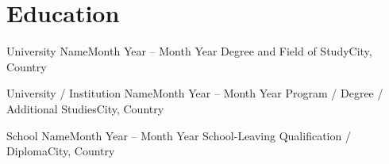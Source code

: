 \section{Education}

\resumeSubHeadingListStart

    \resumeSubheading
        {University Name}{Month Year -- Month Year}
        {Degree and Field of Study}{City, Country}

    \resumeItemListStart
    \resumeItemListEnd

    \resumeSubheading
        {University / Institution Name}{Month Year -- Month Year}
        {Program / Degree / Additional Studies}{City, Country}

    \resumeSubheading
        {School Name}{Month Year -- Month Year}
        {School-Leaving Qualification / Diploma}{City, Country}

    \resumeItemListStart
    \resumeItemListEnd

\resumeSubHeadingListEnd